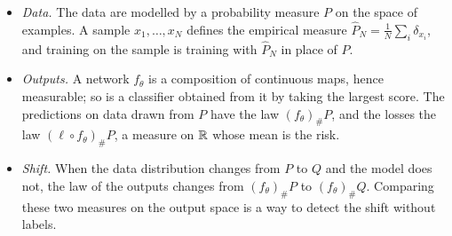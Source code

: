 \begin{notechapter}
\begin{mlthread}
\begin{itemize}[nosep]
  \item \emph{Data.} The data are modelled by a probability measure $P$
        on the space of examples. A sample $x_1,\dots,x_N$ defines the
        empirical measure $\hat P_N = \frac1N\sum_i\delta_{x_i}$, and
        training on the sample is training with $\hat P_N$ in place of
        $P$.
  \item \emph{Outputs.} A network $f_\theta$ is a composition of
        continuous maps, hence measurable; so is a classifier obtained
        from it by taking the largest score. The predictions on data
        drawn from $P$ have the law $(f_\theta)_\#P$, and the losses the
        law $(\ell\circ f_\theta)_\#P$, a measure on $\mathbb{R}$ whose mean is
        the risk.
  \item \emph{Shift.} When the data distribution changes from $P$ to
        $Q$ and the model does not, the law of the outputs changes from
        $(f_\theta)_\#P$ to $(f_\theta)_\#Q$. Comparing these two
        measures on the output space is a way to detect the shift
        without labels.
\end{itemize}
\end{mlthread}


\end{notechapter}
